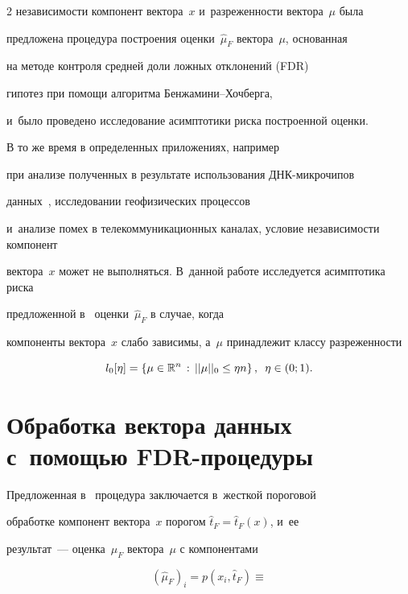 \begin{multicols}{2}
независимости компонент вектора~$x$ и~разреженности вектора~$\mu$ была 

предложена процедура построения оценки~$\hat{\mu}_F$ вектора~$\mu$, основанная 

на методе контроля средней доли ложных отклонений (FDR) 

гипотез при помощи алгоритма Бен\-жа\-ми\-ни--Хоч\-бер\-га,

и~было проведено исследование асимптотики риска построенной оценки.



В то же время в определенных приложениях, например

при анализе полученных в результате использования ДНК-мик\-ро\-чи\-пов 

данных~\cite{ResultsOnFDRUnderDependence}, исследовании геофизических процессов 

и~анализе помех в телекоммуникационных каналах, условие независимости компонент 

вектора~$x$ может не выполняться. В~данной работе исследуется асимптотика риска 

предложенной в~\cite{AdaptingFDR} оценки~$\hat{\mu}_F$ в случае, когда 

компоненты вектора~$x$ слабо зависимы, а~$\mu$ принадлежит классу разреженности

$$

l_0[\eta] = \left\{\mu\in\mathbb{R}^n\,:\, ||\mu||_0 \leq \eta n\right\}, \enskip

\eta\in(0;1).

$$





\section{Обработка вектора данных с~помощью FDR-процедуры}



Предложенная в~\cite{AdaptingFDR} процедура заключается в~жесткой пороговой 

обработке компонент вектора~$x$ порогом $\hat{t}_F = \hat{t}_F(x)$, и~ее 

результат~--- оценка~$\hat{\mu}_F$ вектора~$\mu$ с компонентами



\noindent

\begin{equation*}

(\hat{\mu}_F)_i  = p(x_i,\hat{t}_F) \equiv


\end{equation*}
\end{multicols}
